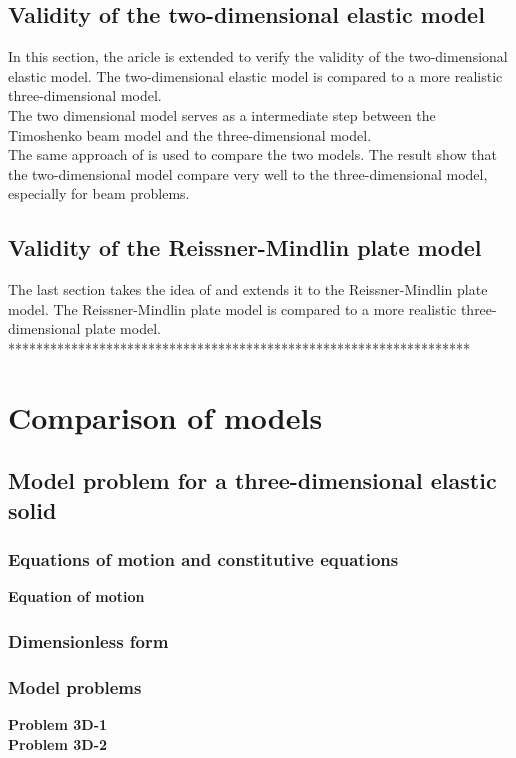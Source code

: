 \documentclass[../main.tex]{subfiles}
\begin{document}
\subsection{Validity of the two-dimensional elastic model}

In this section, the aricle \cite{LVV09} is extended to verify the validity of the two-dimensional elastic model. The two-dimensional elastic model is compared to a more realistic three-dimensional model.\\

The two dimensional model serves as a intermediate step between the Timoshenko beam model and the three-dimensional model.\\

The same approach of \cite{LVV09} is used to compare the two models. The result show that the two-dimensional model compare very well to the three-dimensional model, especially for beam problems.


\subsection{Validity of the Reissner-Mindlin plate model}

The last section takes the idea of \cite{LVV09} and extends it to the Reissner-Mindlin plate model. The Reissner-Mindlin plate model is compared to a more realistic three-dimensional plate model.\\



******************************************************************\\

\section{Comparison of models}
\subsection{Model problem for a three-dimensional elastic solid}
\subsubsection{Equations of motion and constitutive equations}
\textbf{Equation of motion}
\subsubsection{Dimensionless form}
\subsubsection{Model problems}
\textbf{Problem 3D-1}\\
\textbf{Problem 3D-2}
\end{document}
